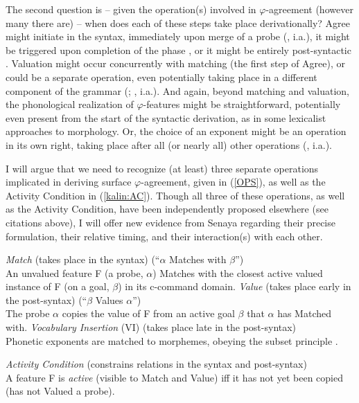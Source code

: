\documentclass[output=paper
,modfonts
,nonflat]{langsci/langscibook}
\begin{document}
The second question is -- given the operation(s) involved in $\varphi$-agreement (however many there are) -- when does each of these steps take place derivationally? Agree might initiate in the syntax, immediately upon merge of a probe ({\citealt{Bejar03,Preminger11,Preminger14}, i.a.}), it might be triggered upon completion of the phase \citep{Chomsky08}, or it might be entirely post-syntactic \citep{Bobaljik08}. Valuation might occur concurrently with matching (the first step of Agree), or could be a separate operation, even potentially taking place in a different component of the grammar (\citealt{vanKoppen07,BBP09,ArregiNevins12,BhattWalkow13,Bonet13,Marusicetal15,Smith17,AtlamazBakerTA}; , i.a.). And again, beyond matching and valuation, the phonological realization of $\varphi$-features  might be straightforward, potentially even present from the start of the syntactic derivation, as in some lexicalist approaches to morphology. Or, the choice of an exponent might be an operation in its own right,  taking place after all (or nearly all) other operations  (\citealt{HalleMarantz93,HalleMarantz94,EmbickNoyer07}, i.a.). 

I will argue that we need to recognize (at least) three separate operations implicated in deriving surface $\varphi$-agreement, given in (\ref{OPS}), as well as the Activity Condition in (\ref{kalin:AC}). Though all three of these operations, as well as the Activity Condition, have been independently proposed elsewhere (see citations above), I will offer new evidence from Senaya regarding their precise formulation, their relative timing, and their interaction(s) with each other.

\eal \label{OPS}
\ex \textit{Match} {(takes place in the syntax)} \- \hfill (``{$\alpha$} Matches with {$\beta$}'')\\
An unvalued feature F (a probe, {$\alpha$}) Matches with the closest active valued instance of F (on a goal, {$\beta$}) in its c-command domain.
\ex \textit{Value} (takes place early in the post-syntax) \- \hfill (``{$\beta$} Values {$\alpha$}'')\\
The probe {$\alpha$} copies the value of F from an active goal {$\beta$} that {$\alpha$} has Matched with.
\ex \textit{Vocabulary Insertion} (VI) (takes place late in the post-syntax)\\
Phonetic exponents are matched to morphemes, obeying the subset principle \citep{Halle97}.
\zl

\ea \textit{Activity Condition} (constrains relations in the syntax and post-syntax)\\A feature F is \textit{active} (visible to Match and Value) iff it has not yet been copied (has not Valued a probe).\label{kalin:AC}
\z
\end{document}

